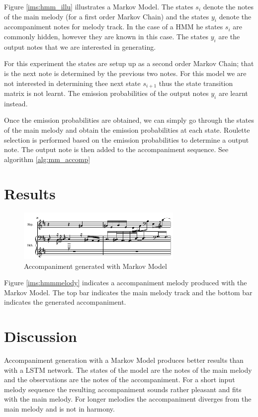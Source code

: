 Figure \ref{ims:hmm_illu} illustrates a Markov Model. The states $s_i$ denote the notes of the main melody (for a first order Markov Chain) and the states $y_i$ denote the accompaniment notes for melody track. In the case of a \ac{HMM} he states $s_i$ are commonly hidden, however they are known in this case. The states $y_i$ are the output notes that we are interested in generating. 

For this experiment the states are setup up as a second order Markov Chain; that is the next note is determined by the previous two notes. For this model we are not interested in determining thee next state $s_{i+1}$ thus the state transition matrix is not learnt. The emission probabilities of the output notes $y_i$ are learnt instead.

Once the emission probabilities are obtained, we can simply go through the states of the main melody and obtain the emission probabilities at each state. Roulette selection is performed based on the emission probabilities to determine a output note. The output note is then added to the accompaniment sequence. See algorithm \ref{alg:mm_accomp}



\section{Results}
\begin{figure}[h!]
\centerline{\includegraphics[width=300px]{../images/markov_model_accomp.pdf}}
\caption{Accompaniment generated with Markov Model}
\label{ims:hmm_accomp}
\end{figure}

Figure \ref{ims:hmmmelody} indicates a accompaniment melody produced with the Markov Model. The top bar indicates the main melody track and the bottom bar indicates the generated accompaniment.

\section{Discussion}
Accompaniment generation with a Markov Model produces better results than with a \ac{LSTM} network. The states of the model are the notes of the main melody and the observations are the notes of the accompaniment. For a short input melody sequence the resulting accompaniment sounds rather pleasant and fits with the main melody. For longer melodies the accompaniment diverges from the main melody and is not in harmony.





